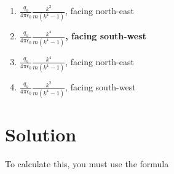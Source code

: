 \begin{enumerate}[label=\uppercase\alph*)]
  \item $\frac{q_o}{4\pi\epsilon_0} \frac{k^2}{m(k^4 - 1)}$, facing north-east
  \item \textbf{$\frac{q_o}{4\pi\epsilon_0} \frac{k^4}{m(k^4 - 1)}$, facing south-west}
  \item $\frac{q_o}{4\pi\epsilon_0} \frac{k^4}{m(k^4 - 1)}$, facing north-east
  \item $\frac{q_o}{4\pi\epsilon_0} \frac{k^2}{m(k^4 - 1)}$, facing south-west
\end{enumerate}

\newpage
\section{Solution}

To calculate this, you must use the formula 

